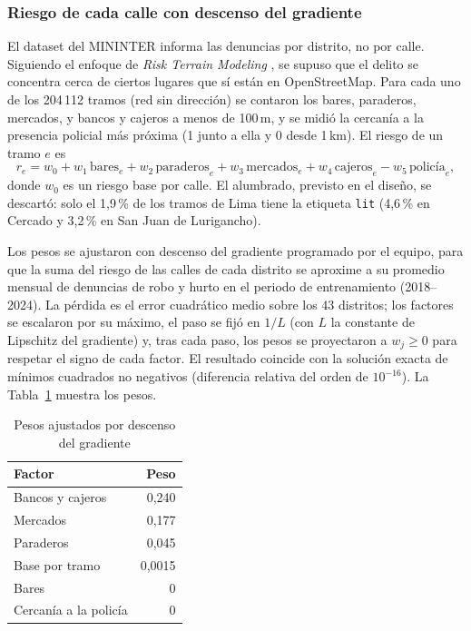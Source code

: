 \subsubsection{Riesgo de cada calle con descenso del gradiente}
El dataset del MININTER informa las denuncias por distrito, no por calle. Siguiendo el enfoque de \emph{Risk Terrain Modeling} \cite{caplan2011}, se supuso que el delito se concentra cerca de ciertos lugares que sí están en OpenStreetMap. Para cada uno de los 204\,112 tramos (red sin dirección) se contaron los bares, paraderos, mercados, y bancos y cajeros a menos de 100\,m, y se midió la cercanía a la presencia policial más próxima (1 junto a ella y 0 desde 1\,km). El riesgo de un tramo $e$ es
\begin{equation}
  r_e = w_0 + w_1\,\text{bares}_e + w_2\,\text{paraderos}_e + w_3\,\text{mercados}_e + w_4\,\text{cajeros}_e - w_5\,\text{policía}_e ,
\end{equation}
donde $w_0$ es un riesgo base por calle. El alumbrado, previsto en el diseño, se descartó: solo el 1,9\,\% de los tramos de Lima tiene la etiqueta \texttt{lit} (4,6\,\% en Cercado y 3,2\,\% en San Juan de Lurigancho).

Los pesos se ajustaron con descenso del gradiente programado por el equipo, para que la suma del riesgo de las calles de cada distrito se aproxime a su promedio mensual de denuncias de robo y hurto en el periodo de entrenamiento (2018--2024). La pérdida es el error cuadrático medio sobre los 43 distritos; los factores se escalaron por su máximo, el paso se fijó en $1/L$ (con $L$ la constante de Lipschitz del gradiente) y, tras cada paso, los pesos se proyectaron a $w_j \ge 0$ para respetar el signo de cada factor. El resultado coincide con la solución exacta de mínimos cuadrados no negativos (diferencia relativa del orden de $10^{-16}$). La Tabla~\ref{tab:pesos} muestra los pesos.

\begin{table}[htbp]
\caption{Pesos ajustados por descenso del gradiente}
\label{tab:pesos}
\centering
\begin{tabular}{lr}
\toprule
Factor & Peso \\
\midrule
Bancos y cajeros & 0,240 \\
Mercados & 0,177 \\
Paraderos & 0,045 \\
Base por tramo & 0,0015 \\
Bares & 0 \\
Cercanía a la policía & 0 \\
\bottomrule
\end{tabular}
\end{table}


